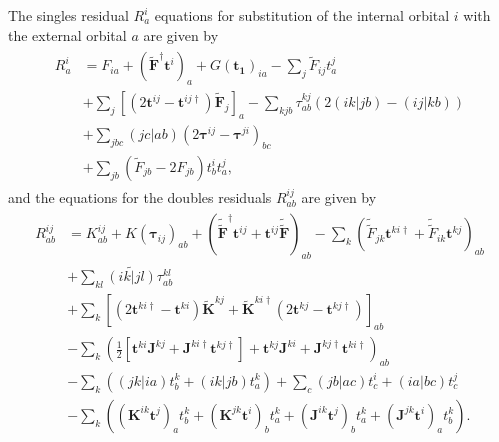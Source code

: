 The singles residual $R_{a}^{i}$ equations for substitution of the internal orbital $i$ with the external orbital
$a$ are given by
\begin{align}
  \begin{split}
    R_{a}^{i}  &= F_{ia}+\left(\pmb{\tilde{F}}^\dagger \pmb{t}^i\right)_a+G(\pmb{t_1})_{ia}-\sum_j \tilde{F}_{ij}t^j_a\\
               & +\sum_{j} \left[(2\pmb{t}^{ij}-\pmb{t}^{ij\dagger})\pmb{\tilde{F}}_{j}\right]_a-\sum_{kjb} \tau_{ab}^{kj} \left(2(ik|jb)-(ij|kb)\right)\\
               & +{\sum_{jbc}(jc|ab)(2\pmb{\tau}^{ij}-\pmb{\tau}^{ji})_{bc}}\\
               & +\sum_{jb}\left(\tilde{F}_{jb}-2F_{jb}\right)t^i_bt^j_a,
  \end{split}
\end{align}
and the equations for the doubles residuals $R^{ij}_{ab}$ are given by
\begin{align}
  \begin{split}
    R^{ij}_{ab} &= K_{ab}^{ij} + K(\pmb{\tau}_{ij})_{ab}
                + (\pmb{\tilde{\tilde{F}}}^\dagger{\pmb{t}^{ij}}+{\pmb{t}^{ij}}\pmb{\tilde{\tilde{F}}})_{ab}
                -\sum_k (\tilde{\tilde{F}}_{jk}\pmb{t}^{ki\dagger}+\tilde{\tilde{F}}_{ik}\pmb{t}^{kj})_{ab}
                \\&+\sum_{kl}\widetilde{(ik|jl)}\tau_{ab}^{kl}\\
                &+{\sum_k \left[ (2\pmb{t}^{ki\dagger}-\pmb{t}^{ki}) \pmb{\tilde{K}}^{kj}+\pmb{\tilde{K}}^{ki\dagger}(2\pmb{t}^{kj}-\pmb{t}^{kj\dagger})\right]_{ab}}\\
                &{-\sum_k \left(\frac{1}{2}\left[\pmb{t}^{ki}\pmb{J}^{kj}+\pmb{J}^{ki\dagger}\pmb{t}^{kj\dagger}\right]
                +\pmb{t}^{kj} \pmb{J}^{ki} + \pmb{J}^{kj\dagger}\pmb{t}^{ki\dagger}\right)_{ab}}\\
                &{ - \sum_k \left((jk|ia)t_b^k + (ik|jb)t_a^k \right) + {\sum_c (jb|ac)t_c^i + (ia|bc)t_c^j}}\\
                &- \sum_k \left( \left(\pmb{K}^{ik}\pmb{t}^j\right)_at_b^k + \left(\pmb{K}^{jk}\pmb{t}^i\right)_b t_a^k
                + \left(\pmb{J}^{ik}\pmb{t}^j\right)_b t_a^k + \left(\pmb{J}^{jk}\pmb{t}^i\right)_a t_b^k \right).
  \end{split}
\end{align}

